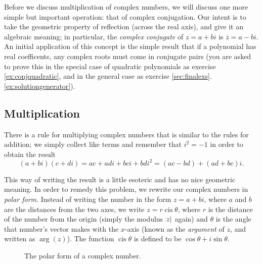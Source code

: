 \documentclass[a4paper,10pt,titlepage]{article}
\theoremstyle{definition}
\DeclareMathOperator{\cis}{cis}
\DeclareMathOperator{\carg}{arg}
\newcommand*\realp[1]{ \mathfrak{Re} \left ( {#1} \right )  }
\newcommand*\imagp[1]{ \mathfrak{Im} \left ( {#1} \right )  }
\begin{document}
Before we discuss multiplication of complex numbers, we will discuss one more simple but important operation: that of complex conjugation. Our intent
is to take the geometric property of reflection (across the real axis), and give it an algebraic meaning; in particular, the \emph{complex conjugate}
of $ z = a + bi $ is $ \overline z = a-bi $. An initial application of this concept is the simple result that if a polynomial has real coefficents,
any complex roots must come in conjugate pairs (you are asked to prove this in the special case of quadratic polynomials as exercise \ref{ex:conjquadratic},
and in the general case as exercise \ref{sec:finalexs}.\ref{ex:solutiongenerator}).

\subsection*{Multiplication}
There is a rule for multiplying complex numbers that is similar to the rules for addition; we simply collect like
terms and remember that $ i^2 = -1 $ in order to obtain the result
\begin{displaymath}
  (a+bi)(c+di) = ac + adi + bci + bdi^2 = (ac - bd) + (ad + bc)i.
\end{displaymath}

This way of writing the result is a little esoteric and has no nice geometric meaning. In order to remedy this problem, we rewrite our
complex numbers in \emph{polar form}. Instead of writing the number in the form $ z = a + bi $, where $ a $ and $ b $
are the distances from the two axes, we write $ z = r \cis \theta $, where $ r $ is the distance of the number from the
origin (simply the modulus $ \abs{z} $ again) and $ \theta $ is the angle that number's vector makes with the $ x$-axis
(known as the \emph{argument} of $ z $, and written as $ \carg(z) $). The function $ \cis \theta $ is defined to be $ \cos \theta + i\sin \theta $.

\begin{figure}
  \centering
  \caption{The polar form of a complex number.}
\end{figure}
\end{document}
